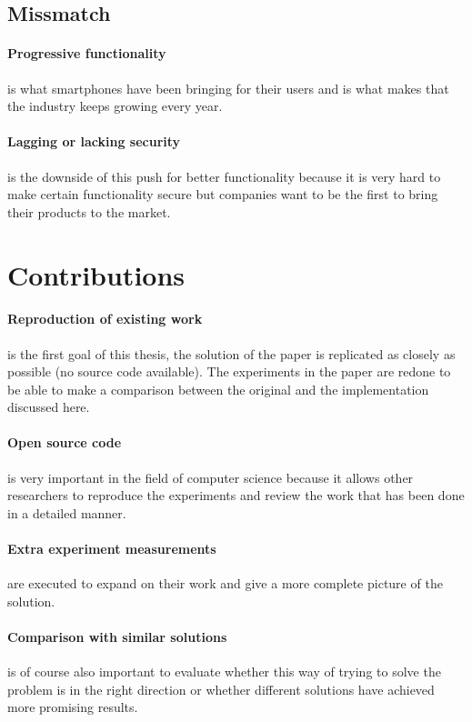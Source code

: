 \documentclass{report}
\begin{document}
\subsection*{Missmatch}

\paragraph*{Progressive functionality}
is what smartphones have been bringing for their users and is what makes that the industry keeps growing every year.

\paragraph*{Lagging or lacking security}
is the downside of this push for better functionality because it is very hard to make certain functionality secure but companies want to be the first to bring their products to the market.

\section{Contributions}

\paragraph*{Reproduction of existing work}
is the first goal of this thesis, the solution of the paper is replicated as closely as possible (no source code available). The experiments in the paper are redone to be able to make a comparison between the original and the implementation discussed here.

\paragraph*{Open source code}
is very important in the field of computer science because it allows other researchers to reproduce the experiments and review the work that has been done in a detailed manner.

\paragraph*{Extra experiment measurements}
are executed to expand on their work and give a more complete picture of the solution.

\paragraph*{Comparison with similar solutions}
is of course also important to evaluate whether this way of trying to solve the problem is in the right direction or whether different solutions have achieved more promising results.
\end{document}
